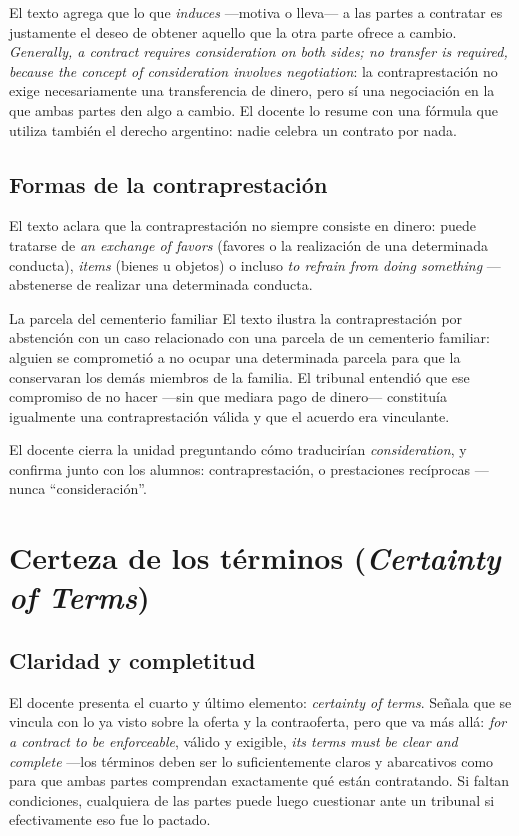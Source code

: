 \documentclass[12pt,oneside]{book}
\begin{document}
El texto agrega que lo que \textit{induces} —motiva o lleva— a las partes a contratar es justamente el deseo de obtener aquello que la otra parte ofrece a cambio. \textit{Generally, a contract requires consideration on both sides; no transfer is required, because the concept of consideration involves negotiation}: la contraprestación no exige necesariamente una transferencia de dinero, pero sí una negociación en la que ambas partes den algo a cambio. El docente lo resume con una fórmula que utiliza también el derecho argentino: nadie celebra un contrato por nada.

\subsection{Formas de la contraprestación}

El texto aclara que la contraprestación no siempre consiste en dinero: puede tratarse de \textit{an exchange of favors} (favores o la realización de una determinada conducta), \textit{items} (bienes u objetos) o incluso \textit{to refrain from doing something} —abstenerse de realizar una determinada conducta.

\begin{example}{La parcela del cementerio familiar}
El texto ilustra la contraprestación por abstención con un caso relacionado con una parcela de un cementerio familiar: alguien se comprometió a no ocupar una determinada parcela para que la conservaran los demás miembros de la familia. El tribunal entendió que ese compromiso de no hacer —sin que mediara pago de dinero— constituía igualmente una contraprestación válida y que el acuerdo era vinculante.
\end{example}

El docente cierra la unidad preguntando cómo traducirían \textit{consideration}, y confirma junto con los alumnos: contraprestación, o prestaciones recíprocas —nunca ``consideración''.

\section{Certeza de los términos (\textit{Certainty of Terms})}

\subsection{Claridad y completitud}

El docente presenta el cuarto y último elemento: \textit{certainty of terms}. Señala que se vincula con lo ya visto sobre la oferta y la contraoferta, pero que va más allá: \textit{for a contract to be enforceable}, válido y exigible, \textit{its terms must be clear and complete} —los términos deben ser lo suficientemente claros y abarcativos como para que ambas partes comprendan exactamente qué están contratando. Si faltan condiciones, cualquiera de las partes puede luego cuestionar ante un tribunal si efectivamente eso fue lo pactado.
\end{document}
